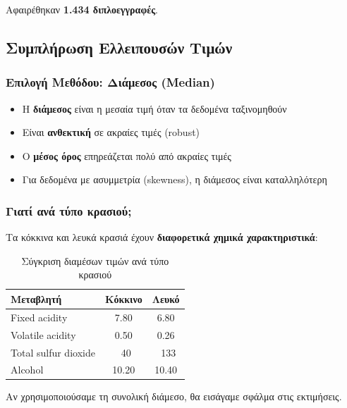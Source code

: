 \documentclass[12pt,a4paper]{article}
\begin{document}
\begin{successbox}[Αποτέλεσμα]
Αφαιρέθηκαν \textbf{1.434 διπλοεγγραφές}.
\end{successbox}

\subsection{Συμπλήρωση Ελλειπουσών Τιμών}

\subsubsection{Επιλογή Μεθόδου: Διάμεσος (Median)}

\begin{infobox}
\begin{itemize}
    \item Η \textbf{διάμεσος} είναι η μεσαία τιμή όταν τα δεδομένα ταξινομηθούν
    \item Είναι \textbf{ανθεκτική} σε ακραίες τιμές (robust)
    \item Ο \textbf{μέσος όρος} επηρεάζεται πολύ από ακραίες τιμές
    \item Για δεδομένα με ασυμμετρία (skewness), η διάμεσος είναι καταλληλότερη
\end{itemize}
\end{infobox}

\subsubsection{Γιατί ανά τύπο κρασιού;}

Τα κόκκινα και λευκά κρασιά έχουν \textbf{διαφορετικά χημικά χαρακτηριστικά}:

\begin{table}[H]
\centering
\caption{Σύγκριση διαμέσων τιμών ανά τύπο κρασιού}
\begin{tabular}{@{}lcc@{}}
\toprule
\textbf{Μεταβλητή} & \textbf{Κόκκινο} & \textbf{Λευκό} \\
\midrule
Fixed acidity & 7.80 & 6.80 \\
Volatile acidity & 0.50 & 0.26 \\
Total sulfur dioxide & ~40 & ~133 \\
Alcohol & 10.20 & 10.40 \\
\bottomrule
\end{tabular}
\end{table}

Αν χρησιμοποιούσαμε τη συνολική διάμεσο, θα εισάγαμε σφάλμα στις εκτιμήσεις.
\end{document}
